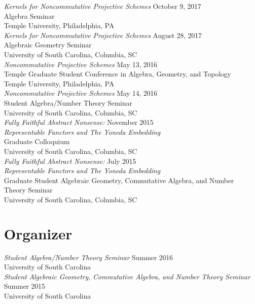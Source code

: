 \documentclass{article}
\begin{document}
\noindent\textsl{Kernels for Noncommutative Projective Schemes} \hfill October 9, 2017\\
Algebra Seminar\\
Temple University, Philadelphia, PA\\

\noindent\textsl{Kernels for Noncommutative Projective Schemes} \hfill August 28, 2017\\
Algebraic Geometry Seminar\\
University of South Carolina, Columbia, SC\\

\noindent\textsl{Noncommutative Projective Schemes} \hfill May 13, 2016\\
Temple Graduate Student Conference in Algebra, Geometry, and Topology\\
Temple University, Philadelphia, PA\\

\noindent\textsl{Noncommutative Projective Schemes} \hfill May 14, 2016\\
Student Algebra/Number Theory Seminar\\
University of South Carolina, Columbia, SC\\

\noindent\textsl{Fully Faithful Abstract Nonsense:} \hfill November 2015\\
\textsl{Representable Functors and The Yoneda Embedding}\\
Graduate Colloquium\\
University of South Carolina, Columbia, SC\\

\noindent\textsl{Fully Faithful Abstract Nonsense:} \hfill July 2015\\
\textsl{Representable Functors and The Yoneda Embedding}\\
Graduate Student Algebraic Geometry, Commutative Algebra, and Number Theory Seminar\\
University of South Carolina, Columbia, SC

\section*{Organizer}
\textsl{Student Algebra/Number Theory Seminar} \hfill Summer 2016\\
University of South Carolina\\

\noindent\textsl{Student Algebraic Geometry, Commutative Algebra, and Number Theory Seminar} \hfill Summer 2015\\
University of South Carolina\\
\end{document}
